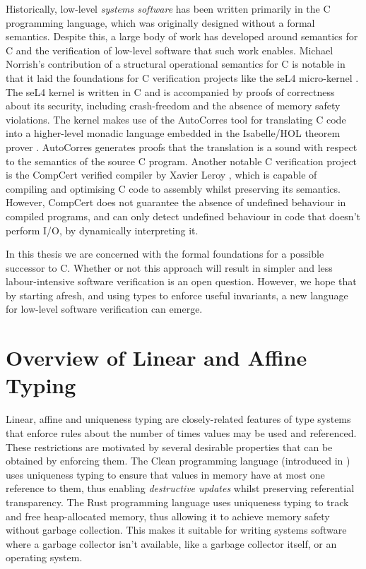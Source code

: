 \documentclass[]{unswthesis}
\let\i\textit
\begin{document}
Historically, low-level \textit{systems software} has been written primarily in the C programming language, which was originally designed without a formal semantics. Despite this, a large body of work has developed around semantics for C and the verification of low-level software that such work enables. Michael Norrish's contribution of a structural operational semantics for C \cite{norrish98} is notable in that it laid the foundations for C verification projects like the seL4 micro-kernel \cite{klein14}. The seL4 kernel is written in C and is accompanied by proofs of correctness about its security, including crash-freedom and the absence of memory safety violations. The kernel makes use of the AutoCorres tool for translating C code into a higher-level monadic language embedded in the Isabelle/HOL theorem prover \cite{greenaway14}. AutoCorres generates proofs that the translation is a sound with respect to the semantics of the source C program.
Another notable C verification project is the CompCert verified compiler by Xavier Leroy \cite{leroy09}, which is capable of compiling and optimising C code to assembly whilst preserving its semantics. However, CompCert does not guarantee the absence of undefined behaviour in compiled programs, and can only detect undefined behaviour in code that doesn't perform I/O, by dynamically interpreting it.

In this thesis we are concerned with the formal foundations for a possible successor to C. Whether or not this approach will result in simpler and less labour-intensive software verification is an open question. However, we hope that by starting afresh, and using types to enforce useful invariants, a new language for low-level software verification can emerge.

\section{Overview of Linear and Affine Typing}

Linear, affine and uniqueness typing are closely-related features of type systems that enforce rules about the number of times values may be used and referenced. These restrictions are motivated by several desirable properties that can be obtained by enforcing them. The Clean programming language (introduced in \cite{clean87}) uses uniqueness typing to ensure that values in memory have at most one reference to them, thus enabling \i{destructive updates} whilst preserving referential transparency. The Rust programming language \cite{rustWeb} uses uniqueness typing to track and free heap-allocated memory, thus allowing it to achieve memory safety without garbage collection. This makes it suitable for writing systems software where a garbage collector isn't available, like a garbage collector itself, or an operating system.
\end{document}
